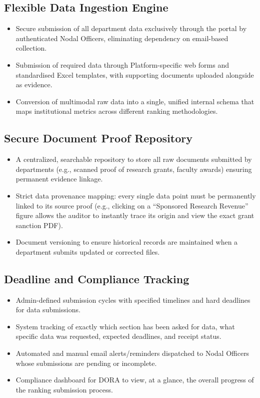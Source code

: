 \documentclass[11pt]{article}
\begin{document}
\subsection{Flexible Data Ingestion Engine}
\begin{itemize}[leftmargin=1.4em, itemsep=3pt]
\item Secure submission of all department data exclusively through the portal by authenticated Nodal Officers, eliminating dependency on email-based collection.
\item Submission of required data through Platform-specific web forms and standardised Excel templates, with supporting documents uploaded alongside as evidence.
\item Conversion of multimodal raw data into a single, unified internal schema that maps institutional metrics across different ranking methodologies.
\end{itemize}

\subsection{Secure Document Proof Repository}
\begin{itemize}[leftmargin=1.4em, itemsep=3pt]
\item A centralized, searchable repository to store all raw documents submitted by departments (e.g., scanned proof of research grants, faculty awards) ensuring permanent evidence linkage.
\item Strict data provenance mapping: every single data point must be permanently linked to its source proof (e.g., clicking on a ``Sponsored Research Revenue'' figure allows the auditor to instantly trace its origin and view the exact grant sanction PDF).
\item Document versioning to ensure historical records are maintained when a department submits updated or corrected files.
\end{itemize}

\subsection{Deadline and Compliance Tracking}
\begin{itemize}[leftmargin=1.4em, itemsep=3pt]
\item Admin-defined submission cycles with specified timelines and hard deadlines for data submissions.
\item System tracking of exactly which section has been asked for data, what specific data was requested, expected deadlines, and receipt status.
\item Automated and manual email alerts/reminders dispatched to Nodal Officers whose submissions are pending or incomplete.
\item Compliance dashboard for DORA to view, at a glance, the overall progress of the ranking submission process.
\end{itemize}
\end{document}
